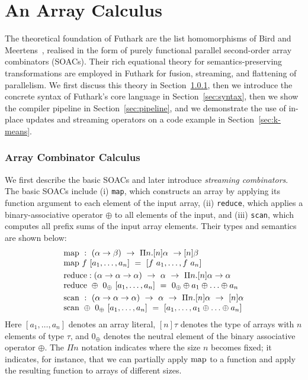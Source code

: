 \chapter{An Array Calculus}

The theoretical foundation of Futhark are the list homomorphisms of
Bird and Meertens~\cite{Bird2}, realised in the form of
purely functional parallel second-order array combinators (SOACs). Their rich equational theory for semantics-preserving
transformations are employed in Futhark for fusion, streaming,
and flattening of parallelism.  We first discuss this theory in
Section~\ref{sec:arraycombinators}, then we introduce the concrete
syntax of Futhark's core language in Section~\ref{sec:syntax}, then we
show the compiler pipeline in Section~\ref{sec:pipeline}, and we
demonstrate the use of in-place updates and streaming operators on a
code example in Section~\ref{sec:k-means}.

\subsection{Array Combinator Calculus}
\label{sec:arraycombinators}

We first describe the basic SOACs and later introduce
\textit{streaming combinators}. The basic SOACs include (i)
\lstinline{map}, which constructs an array by applying its function argument to
each element of the input array, (ii) \lstinline{reduce}, which applies a
binary-associative operator $\oplus$ to all elements of the input,
and (iii) \lstinline{scan}, which computes all prefix sums of the
input array elements.  Their types and semantics are shown below:
%
\[ \begin{array}{l}
\map ~ : ~ (\alpha \to \beta) ~ \to ~ \Pi n. [n]\alpha ~ \to [n]\beta \\
\map ~ f ~ [a_1, \ldots, a_n] ~ = ~ [f ~ a_1, \ldots, f ~ a_n]\smallskip\\
\reduce : (\alpha \to \alpha \to \alpha) ~ \to ~ \alpha ~ \to ~ \Pi n.[n]\alpha \to \alpha\\
\reduce ~ \oplus ~ 0_{\oplus} ~ [a_1, \ldots, a_n] ~ = ~ 0_{\oplus} \oplus a_1 \oplus \ldots \oplus a_n\smallskip\\
\scan ~ : ~ (\alpha \to \alpha \to \alpha) ~ \to ~ \alpha ~ \to ~ \Pi n.[n]\alpha ~ \to ~ [n]\alpha\\
\scan ~ \oplus ~ 0_{\oplus} ~ [a_1, \ldots, a_n] ~ = ~ [a_1, \ldots, a_1 \oplus \ldots \oplus a_n]\\
\end{array} \]
\noindent Here $[a_1, \ldots, a_n]$ denotes an array literal,
$[n]\tau$ denotes the type of arrays with $n$ elements of type $\tau$,
and $0_{\oplus}$ denotes the neutral element of the binary associative
operator $\oplus$.  The $\Pi n$ notation indicates where the size $n$
becomes fixed; it indicates, for instance, that we can partially apply
$\mathrm{map}$ to a function and apply the resulting function to arrays of different sizes.

